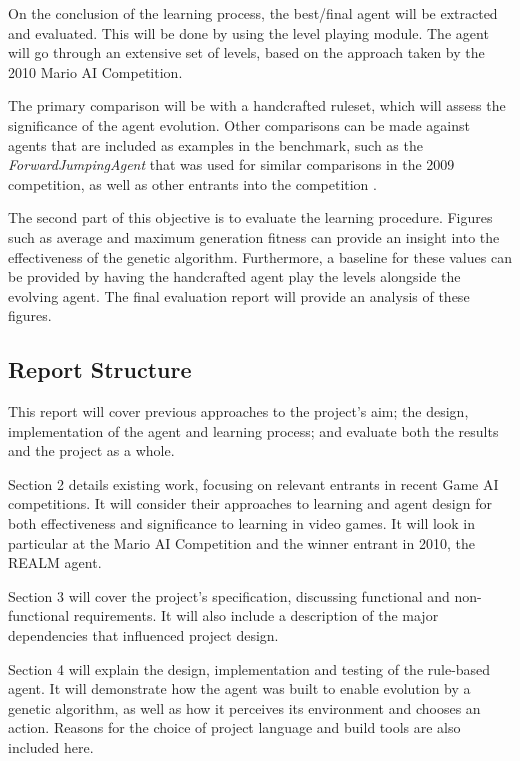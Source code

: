 On the conclusion of the learning process, the best/final agent will be extracted and evaluated. This will be done by using the level playing module. The agent will go through an extensive set of levels, based on the approach taken by the 2010 Mario AI Competition.

The primary comparison will be with a handcrafted ruleset, which will assess the significance of the agent evolution. Other comparisons can be made against agents that are included as examples in the benchmark, such as the \emph{ForwardJumpingAgent} that was used for similar comparisons in the 2009 competition, as well as other entrants into the competition \cite[p.~7]{2010the}.

The second part of this objective is to evaluate the learning procedure. Figures such as average and maximum generation fitness can provide an insight into the effectiveness of the genetic algorithm. Furthermore, a baseline for these values can be provided by having the handcrafted agent play the levels alongside the evolving agent. The final evaluation report will provide an analysis of these figures.

\subsection{Report Structure}

This report will cover previous approaches to the project's aim; the design, implementation of the agent and learning process; and evaluate both the results and the project as a whole.

Section 2 details existing work, focusing on relevant entrants in recent Game AI competitions. It will consider their approaches to learning and agent design for both effectiveness and significance to learning in video games. It will look in particular at the Mario AI Competition and the winner entrant in 2010, the REALM agent.

Section 3 will cover the project's specification, discussing functional and non-functional requirements. It will also include a description of the major dependencies that influenced project design.

Section 4 will explain the design, implementation and testing of the rule-based agent. It will demonstrate how the agent was built to enable evolution by a genetic algorithm, as well as how it perceives its environment and chooses an action. Reasons for the choice of project language and build tools are also included here. 


